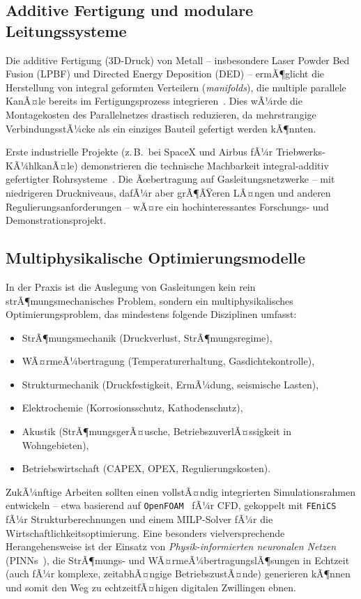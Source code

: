 ﻿\documentclass[12pt,a4paper,twoside]{article}
\theoremstyle{plain}
\theoremstyle{definition}
\theoremstyle{remark}
\begin{document}
\subsection{Additive Fertigung und modulare Leitungssysteme}
\label{ssec:ausblick_3d}

Die additive Fertigung (3D-Druck) von Metall -- insbesondere Laser Powder Bed Fusion
(LPBF) und Directed Energy Deposition (DED) -- ermÃ¶glicht die Herstellung von
integral geformten Verteilern (\textit{manifolds}), die multiple parallele
KanÃ¤le bereits im Fertigungsprozess integrieren~\cite{Thompson2016}.
Dies wÃ¼rde die Montagekosten des Parallelnetzes drastisch reduzieren, da
mehrstrangige VerbindungsstÃ¼cke als ein einziges Bauteil gefertigt werden kÃ¶nnten.

Erste industrielle Projekte (z.\,B.\ bei SpaceX und Airbus fÃ¼r Triebwerks-KÃ¼hlkanÃ¤le)
demonstrieren die technische Machbarkeit integral-additiv gefertigter
Rohrsysteme~\cite{Gradl2021}.
Die Ãœbertragung auf Gasleitungsnetzwerke -- mit niedrigeren Druckniveaus, dafÃ¼r
aber grÃ¶ÃŸeren LÃ¤ngen und anderen Regulierungsanforderungen -- wÃ¤re ein
hochinteressantes Forschungs- und Demonstrationsprojekt.

\subsection{Multiphysikalische Optimierungsmodelle}
\label{ssec:ausblick_multi}

In der Praxis ist die Auslegung von Gasleitungen kein rein strÃ¶mungsmechanisches
Problem, sondern ein multiphysikalisches Optimierungsproblem, das mindestens
folgende Disziplinen umfasst:
\begin{itemize}
  \item StrÃ¶mungsmechanik (Druckverlust, StrÃ¶mungsregime),
  \item WÃ¤rmeÃ¼bertragung (Temperaturerhaltung, Gasdichtekontrolle),
  \item Strukturmechanik (Druckfestigkeit, ErmÃ¼dung, seismische Lasten),
  \item Elektrochemie (Korrosionsschutz, Kathodenschutz),
  \item Akustik (StrÃ¶mungsgerÃ¤usche, BetriebszuverlÃ¤ssigkeit in Wohngebieten),
  \item Betriebswirtschaft (CAPEX, OPEX, Regulierungskosten).
\end{itemize}
ZukÃ¼nftige Arbeiten sollten einen vollstÃ¤ndig integrierten Simulationsrahmen
entwickeln -- etwa basierend auf \texttt{OpenFOAM}~\cite{Jasak2007} fÃ¼r CFD,
gekoppelt mit \texttt{FEniCS}~\cite{AlnaesEtal2015} fÃ¼r Strukturberechnungen
und einem MILP-Solver fÃ¼r die Wirtschaftlichkeitsoptimierung.
Eine besonders vielversprechende Herangehensweise ist der Einsatz von
\emph{Physik-informierten neuronalen Netzen} (PINNs~\cite{Raissi2019}), die
StrÃ¶mungs- und WÃ¤rmeÃ¼bertragungslÃ¶sungen in Echtzeit (auch fÃ¼r komplexe,
zeitabhÃ¤ngige BetriebszustÃ¤nde) generieren kÃ¶nnen und somit den Weg zu
echtzeitfÃ¤higen digitalen Zwillingen ebnen.
\end{document}
